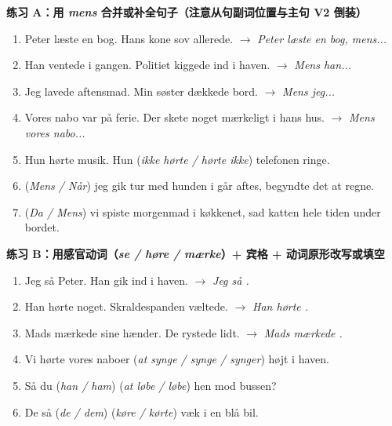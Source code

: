 
\textbf{练习 A：用 \textit{mens} 合并或补全句子（注意从句副词位置与主句 V2 倒装）}
\begin{enumerate}
  \item Peter læste en bog. Hans kone sov allerede. $\rightarrow$ \textit{Peter læste en bog, mens...}
  \item Han ventede i gangen. Politiet kiggede ind i haven. $\rightarrow$ \textit{Mens han...}
  \item Jeg lavede aftensmad. Min søster dækkede bord. $\rightarrow$ \textit{Mens jeg...}
  \item Vores nabo var på ferie. Der skete noget mærkeligt i hans hus. $\rightarrow$ \textit{Mens vores nabo...}
  \item Hun hørte musik. Hun \underline{\hspace{2.4cm}} (\textit{ikke hørte / hørte ikke}) telefonen ringe.
  \item \underline{\hspace{1.4cm}} (\textit{Mens / Når}) jeg gik tur med hunden i går aftes, begyndte det at regne.
  \item \underline{\hspace{1.4cm}} (\textit{Da / Mens}) vi spiste morgenmad i køkkenet, sad katten hele tiden under bordet.
\end{enumerate}

\textbf{练习 B：用感官动词（\textit{se / høre / mærke}）+ 宾格 + 动词原形改写或填空}
\begin{enumerate}
  \item Jeg så Peter. Han gik ind i haven. $\rightarrow$ \textit{Jeg så \underline{\hspace{2.8cm}}.}
  \item Han hørte noget. Skraldespanden væltede. $\rightarrow$ \textit{Han hørte \underline{\hspace{2.8cm}}.}
  \item Mads mærkede sine hænder. De rystede lidt. $\rightarrow$ \textit{Mads mærkede \underline{\hspace{2.8cm}}.}
  \item Vi hørte vores naboer \underline{\hspace{2.2cm}} (\textit{at synge / synge / synger}) højt i haven.
  \item Så du \underline{\hspace{1.4cm}} (\textit{han / ham}) \underline{\hspace{2.0cm}} (\textit{at løbe / løbe}) hen mod bussen?
  \item De så \underline{\hspace{1.4cm}} (\textit{de / dem}) \underline{\hspace{2.0cm}} (\textit{køre / kørte}) væk i en blå bil.
\end{enumerate}

